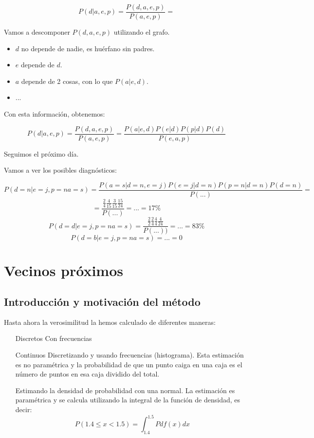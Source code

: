 \documentclass{apuntes}
\begin{document}
\[
P(d|a,e,p) = \frac{P(d,a,e,p)}{P(a,e,p)} =
\]

Vamos a descomponer $P(d,a,e,p)$ utilizando el grafo.

\begin{itemize}
	\item $d$ no depende de nadie, es huérfano sin padres.
	\item $e$ depende de $d$.
	\item $a$ depende de 2 cosas, con lo que $P(a|e,d)$.
	\item ...
\end{itemize}

Con esta información, obtenemos:

\[
P(d|a,e,p) = \frac{P(d,a,e,p)}{P(a,e,p)} =  \frac{P(a|e,d)P(e|d)P(p|d)P(d)}{P(e,a,p)}
\]

Seguimos el próximo día.


Vamos a ver los posibles diagnósticos:

\[
P(d=n|e=j,p=na=s) = \frac{P(a=s|d=n,e=j)P(e=j|d=n)P(p=n|d=n)P(d=n)}{P(...)} =
\]
\[
= \frac{\frac{2}{4}\frac{4}{15}\frac{3}{15}\frac{15}{24}}{P(...)} = ... = 17\%
\]
\[
P(d=d|e=j,p=na=s) = \frac{\frac{2}{2}\frac{2}{4}\frac{4}{4}\frac{4}{24}}{P(...))} = ... = 83\%
\]
\[
P(d=b|e=j,p=na=s) = ... = 0
\]


\section{Vecinos próximos}

\subsection{Introducción y motivación del método}
Hasta ahora la verosimilitud la hemos calculado de diferentes maneras:

\begin{itemize}
 	\item[Discretos] Con frecuencias
 	\item[Continuos]  Discretizando y usando frecuencias (histograma). Esta estimación es no paramétrica y la probabilidad de que un punto caiga en una caja es el número de puntos en esa caja dividido del total.
 	\item[] Estimando la densidad de probabilidad con una normal. La estimación es paramétrica y se calcula utilizando la integral de la función de densidad, es decir:
 	\[P(1.4 \leq x < 1.5) = \int_{1.4}^{1.5}P df(x)dx\]
 \end{itemize}
\end{document}
